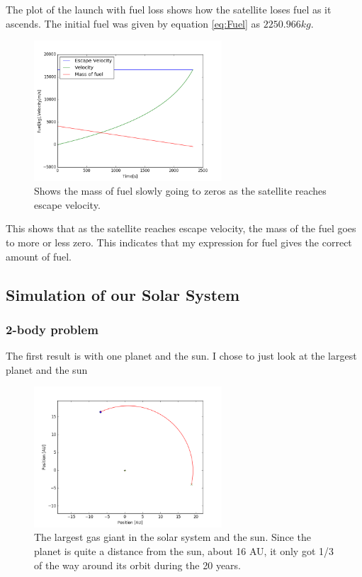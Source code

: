 \documentclass[a4paper, 10pt]{article}
\begin{document}
The plot of the launch with fuel loss shows how the satellite loses fuel as it ascends. The initial fuel was given by equation \ref{eq:Fuel} as $2250.966 kg$.


\begin{figure}[H]
\begin{center}
\includegraphics[width = 70mm]{part1launchVarMass.png}
\caption{Shows the mass of fuel slowly going to zeros as the satellite reaches escape velocity.}
\end{center}
\end{figure}

This shows that as the satellite reaches escape velocity, the mass of the fuel goes to more or less zero. This indicates that my expression for fuel gives the correct amount of fuel.

\subsection{Simulation of our Solar System}
\subsubsection{2-body problem}

The first result is with one planet and the sun. I chose to just look at the largest planet and the sun


\begin{figure}[H]
\begin{center}
\includegraphics[width = 70mm]{part2onePlanet.png}
\caption{The largest gas giant in the solar system and the sun. Since the planet is quite a distance from the sun, about 16 AU, it only got 1/3 of the way around its orbit during the 20 years.}
\end{center}
\end{figure}
\end{document}
